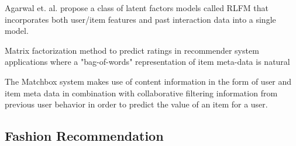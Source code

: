 

Agarwal et. al. \cite{Agarwal2009} propose a class of latent factors models called RLFM that incorporates both user/item features and past interaction data into a single model.



Matrix factorization method to predict ratings in recommender system applications where a "bag-of-words" representation of item meta-data is natural

The Matchbox system makes use of content information in the form of user and item meta data in combination with collaborative filtering information from previous user behavior in order to predict the value of an item for a user.


\subsection{Fashion Recommendation}






